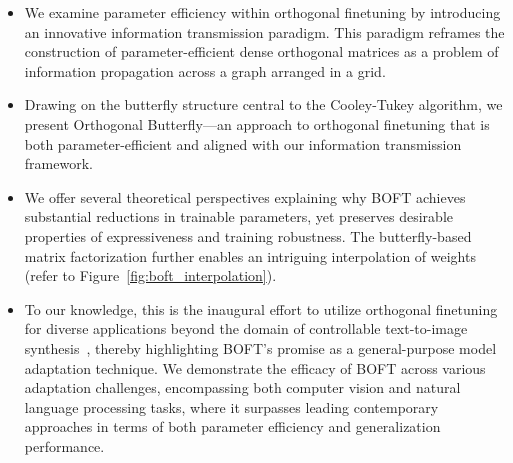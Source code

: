 \begin{itemize}[leftmargin=*,nosep]
    \item We examine parameter efficiency within orthogonal finetuning by introducing an innovative information transmission paradigm. This paradigm reframes the construction of parameter-efficient dense orthogonal matrices as a problem of information propagation across a graph arranged in a grid.
    \item Drawing on the butterfly structure central to the Cooley-Tukey algorithm, we present Orthogonal Butterfly—an approach to orthogonal finetuning that is both parameter-efficient and aligned with our information transmission framework.
    \item We offer several theoretical perspectives explaining why BOFT achieves substantial reductions in trainable parameters, yet preserves desirable properties of expressiveness and training robustness. The butterfly-based matrix factorization further enables an intriguing interpolation of weights (refer to Figure~\ref{fig:boft_interpolation}).
    \item To our knowledge, this is the inaugural effort to utilize orthogonal finetuning for diverse applications beyond the domain of controllable text-to-image synthesis~\cite{qiu2023controlling}, thereby highlighting BOFT’s promise as a general-purpose model adaptation technique. We demonstrate the efficacy of BOFT across various adaptation challenges, encompassing both computer vision and natural language processing tasks, where it surpasses leading contemporary approaches in terms of both parameter efficiency and generalization performance.
\end{itemize}

